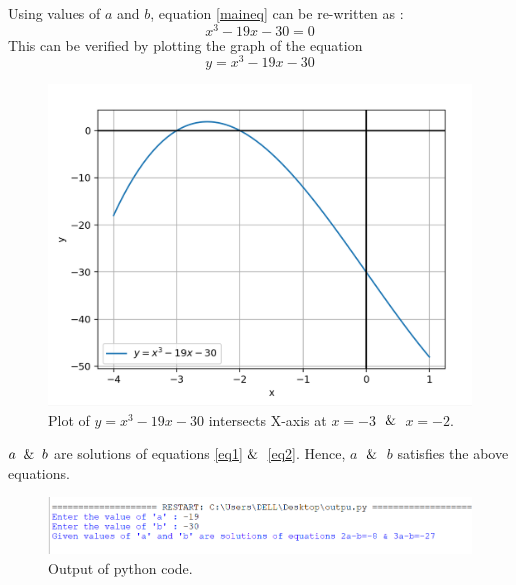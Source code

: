 \documentclass[journal,12pt,twocolumn]{IEEEtran}
\begin{document}
    Using values of $a$ and $b$, equation \eqref{maineq} can be re-written as :
    \begin{equation}
    \label{Peq}
        x^3-19x-30=0
    \end{equation}
    This can be verified by plotting the graph of the equation
    \begin{equation}
    \label{grapheq}
        y=x^3-19x-30
    \end{equation}
    
\begin{figure}[h!]
    \includegraphics[width=\columnwidth]{figs/graph.png}
    \caption{Plot of $y=x^3-19x-30$ intersects X-axis at $x=-3$ $\And$ $x=-2$. }
    \label{graph}

\end{figure}
\newpage
$a\And b$ are solutions of equations \eqref{eq1}$\And$ \eqref{eq2}. Hence, $a$ $\And$ $b$ satisfies the above equations.

\begin{figure}[h!]
    \centering
    \includegraphics[width=\columnwidth]{figs/output.png}
    \caption{Output of python code.}
    \label{op}
\end{figure}
\end{document}
